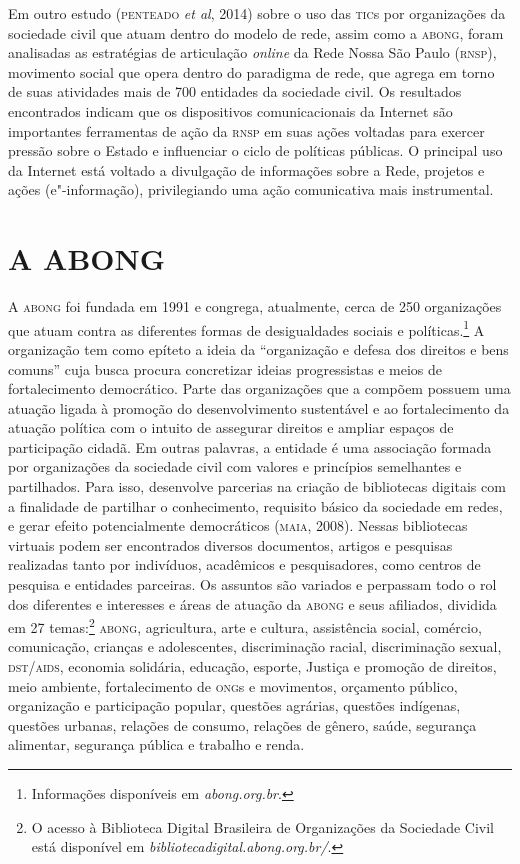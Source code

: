 Em outro estudo (\textsc{penteado} \textit{et al}, 2014) sobre o uso das \textsc{tic}s por
organizações da sociedade civil que atuam dentro do modelo de rede,
assim como a \textsc{abong}, foram analisadas as estratégias de articulação
\textit{online} da Rede Nossa São Paulo (\textsc{rnsp}), movimento social que opera
dentro do paradigma de rede, que agrega em torno de suas atividades mais
de 700 entidades da sociedade civil. Os resultados encontrados indicam
que os dispositivos comunicacionais da Internet são importantes
ferramentas de ação da \textsc{rnsp} em suas ações voltadas para exercer pressão
sobre o Estado e influenciar o ciclo de políticas públicas. O principal
uso da Internet está voltado a divulgação de informações sobre a Rede,
projetos e ações (e"-informação), privilegiando uma ação comunicativa
mais instrumental.

\section{A ABONG}

A \textsc{abong} foi fundada em 1991 e congrega, atualmente, cerca de 250
organizações que atuam contra as diferentes formas de desigualdades
sociais e políticas.\footnote{Informações disponíveis em \textit{abong.org.br}.} A organização tem como epíteto a ideia
da ``organização e defesa dos direitos e bens comuns'' cuja busca procura
concretizar ideias progressistas e meios de fortalecimento democrático.
Parte das organizações que a compõem possuem uma atuação ligada à
promoção do desenvolvimento sustentável e ao fortalecimento da atuação
política com o intuito de assegurar direitos e ampliar espaços de
participação cidadã. Em outras palavras, a entidade é uma associação
formada por organizações da sociedade civil com valores e princípios
semelhantes e partilhados. Para isso, desenvolve parcerias na criação de
bibliotecas digitais com a finalidade de partilhar o conhecimento,
requisito básico da sociedade em redes, e gerar efeito potencialmente
democráticos (\textsc{maia}, 2008). Nessas bibliotecas virtuais podem ser
encontrados diversos documentos, artigos e pesquisas realizadas tanto
por indivíduos, acadêmicos e pesquisadores, como centros de pesquisa e
entidades parceiras. Os assuntos são variados e perpassam todo o rol dos
diferentes e interesses e áreas de atuação da \textsc{abong} e seus afiliados,
dividida em 27 temas:\footnote{O acesso à Biblioteca Digital Brasileira
  de Organizações da Sociedade Civil está disponível em \textit{bibliotecadigital.abong.org.br/}.} \textsc{abong}, agricultura, arte e cultura,
assistência social, comércio, comunicação, crianças e adolescentes,
discriminação racial, discriminação sexual, \textsc{dst}/\textsc{aids}, economia
solidária, educação, esporte, Justiça e promoção de direitos, meio
ambiente, fortalecimento de \textsc{ong}s e movimentos, orçamento público,
organização e participação popular, questões agrárias, questões
indígenas, questões urbanas, relações de consumo, relações de gênero,
saúde, segurança alimentar, segurança pública e trabalho e renda.

